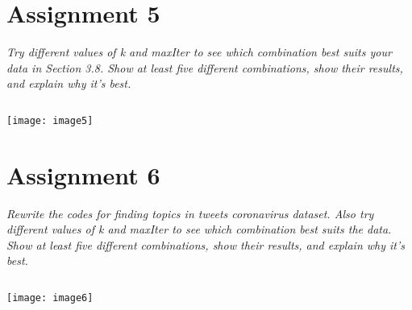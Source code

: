 \documentclass[]{article}
\begin{document}
\section*{Assignment 5}
\emph{ Try different values of k and maxIter to see which combination best suits your data in Section 3.8. Show at least five different combinations, show their results, and explain why it’s best.
}

\begin{verbatim}

\end{verbatim}
\texttt{[image: image5]} %


\section*{Assignment 6}
\emph{ Rewrite the codes for finding topics in tweets coronavirus dataset.  Also try different values of k and maxIter to see which combination best suits the data. Show at least five different combinations, show their results, and explain why it’s best.
 }

\begin{verbatim}

\end{verbatim}
\texttt{[image: image6]} %
\end{document}
